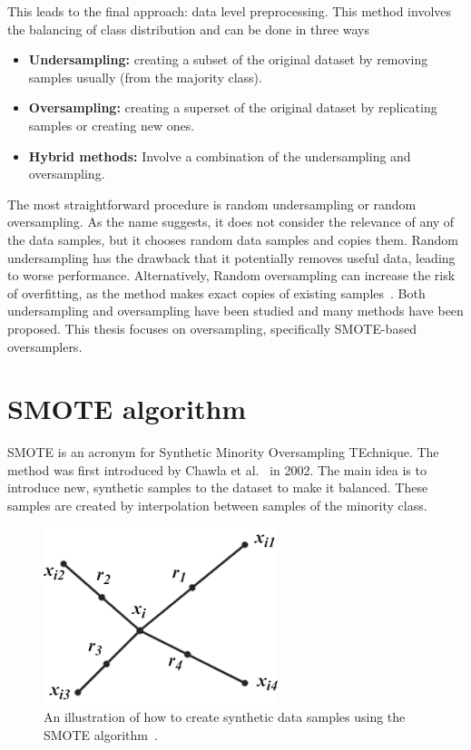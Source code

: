 This leads to the final approach: data level preprocessing. This method involves the balancing of class distribution and can be done in three ways~\cite{Batista2004AData}
\begin{itemize}
    \item \textbf{Undersampling:} creating a subset of the original dataset by removing samples usually (from the majority class).
    \item \textbf{Oversampling:} creating a superset of the original dataset by replicating samples or creating new ones.
    \item \textbf{Hybrid methods:} Involve a combination of the undersampling and oversampling.
\end{itemize}
The most straightforward procedure is random undersampling or random oversampling. As the name suggests, it does not consider the relevance of any of the data samples, but it chooses random data samples and copies them. Random undersampling has the drawback that it potentially removes useful data, leading to worse performance. Alternatively, Random oversampling can increase the risk of overfitting, as the method makes exact copies of existing samples~\cite{Fernandez2018LearningSets}. Both undersampling and oversampling have been studied and many methods have been proposed. This thesis focuses on oversampling, specifically SMOTE-based oversamplers.

\section{SMOTE algorithm}
SMOTE is an acronym for Synthetic Minority Oversampling TEchnique. The method was first introduced by Chawla et al.~\cite{Chawla2002SMOTE:Technique} in 2002. The main idea is to introduce new, synthetic samples to the dataset to make it balanced. These samples are created by interpolation between samples of the minority class. 

\begin{figure}
    \centering
    \includegraphics[width=.4\textwidth]{Thesis/Figures/SMOTE_alg.png}
    \caption{An illustration of how to create synthetic data samples using the SMOTE algorithm~\cite{Fernandez2018LearningSets}.}
    \label{fig:SMOTE}
\end{figure}

